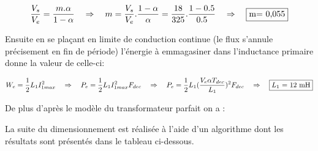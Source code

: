 \documentclass[12pt]{article}
\begin{document}
\vspace{5pt}

$$\dfrac{V_s}{V_e} = \dfrac{m.\alpha}{1-\alpha} \quad \Rightarrow \quad m = \dfrac{V_s}{V_e}.\dfrac{1-\alpha}{\alpha} = \dfrac{18}{325}.\dfrac{1-0.5}{0.5} \quad \Rightarrow \quad \fbox{m=  0,055}$$

\vspace{15pt}
Ensuite en se plaçant en limite de conduction continue (le flux s'annule précisement en fin de période) l'énergie à emmagasiner dans l'inductance primaire donne la valeur de celle-ci:



$$W_e = \frac{1}{2}L_1 I_{1max}^2 \quad\Rightarrow\quad P_e = \frac{1}{2}L_1 I_{1max}^2F_{dec} \quad \Rightarrow \quad P_e = \frac{1}{2}L_1(\dfrac{V_e\alpha T_{dec}}{L_1})^2F_{dec} \quad \Rightarrow \quad \fbox{$L_1$ = 12 mH}$$

De plus d'après le modèle du transformateur parfait on a : \par
\vspace{10pt}

La suite du dimensionnement est réalisée à l'aide d'un algorithme \cite{labible} dont les résultats sont présentés dans le tableau ci-dessous.
\end{document}
